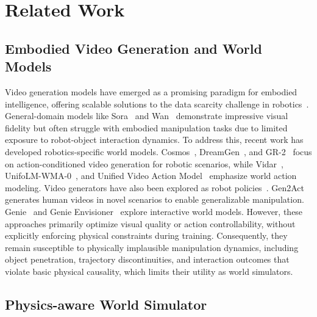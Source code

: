 \section{Related Work}

\subsection{Embodied Video Generation and World Models}

Video generation models have emerged as a promising paradigm for embodied intelligence, offering scalable solutions to the data scarcity challenge in robotics~\cite{openai2024sora,wan2025wan,kong2024hunyuanvideo,yang2024cogvideox,GoogleDeepMind2025Veo3}. General-domain models like Sora~\cite{openai2024sora} and Wan~\cite{wan2025wan} demonstrate impressive visual fidelity but often struggle with embodied manipulation tasks due to limited exposure to robot-object interaction dynamics. To address this, recent work has developed robotics-specific world models. Cosmos~\cite{nvidia2026worldsimulationvideofoundation}, DreamGen~\cite{jang2025dreamgen}, and GR-2~\cite{cheang2024gr} focus on action-conditioned video generation for robotic scenarios, while Vidar~\cite{feng2025vidar}, UnifoLM-WMA-0~\cite{unifolm-wma-0}, and Unified Video Action Model~\cite{li2025unified} emphasize world action modeling. Video generators have also been explored as robot policies~\cite{liang2025video,hu2024video}. Gen2Act~\cite{bharadhwaj2024gen2act} generates human videos in novel scenarios to enable generalizable manipulation. Genie~\cite{bruce2024genie} and Genie Envisioner~\cite{liao2025genie} explore interactive world models. However, these approaches primarily optimize visual quality or action controllability, without explicitly enforcing physical constraints during training. Consequently, they remain susceptible to physically implausible manipulation dynamics, including object penetration, trajectory discontinuities, and interaction outcomes that violate basic physical causality, which limits their utility as world simulators.

\subsection{Physics-aware World Simulator}

